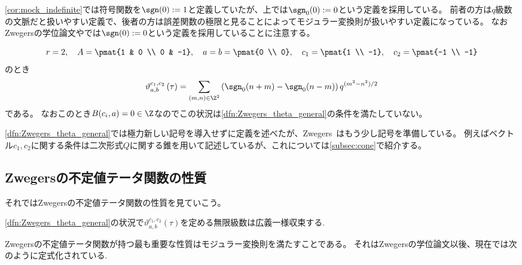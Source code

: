 \documentclass[11pt,b5paper,oneside,lualatex]{ltjsarticle} %
\numberwithin{equation}{section} %
\begin{document}
\begin{rem}
	\cref{cor:mock_indefinite}では符号関数を$ \sgn(0) := 1 $と定義していたが、上では$ \sgn_0(0) := 0 $という定義を採用している。
	前者の方は$ q $級数の文脈だと扱いやすい定義で、後者の方は誤差関数の極限と見ることによってモジュラー変換則が扱いやすい定義になっている。
	なおZwegersの学位論文\cite{Zwegers_thesis}や\cite{BFOR}では$ \sgn(0) := 0 $という定義を採用していることに注意する。
\end{rem}

\begin{ex}
	\[
	r = 2, \quad
	A = \pmat{1 & 0 \\ 0 & -1}, \quad
	a = b = \pmat{0 \\ 0}, \quad
	c_1= \pmat{1 \\ -1}, \quad
	c_2= \pmat{-1 \\ -1}
	\]
	のとき
	\[
	\vartheta_{a, b}^{c_1, c_2} \left( \tau \right)
	=
	\sum_{(m, n) \in \Z^2} \left( \sgn_0(n+m) - \sgn_0(n-m) \right) q^{(m^2 - n^2)/2}
	\]
	である。
	なおこのとき$ B(c_i, a) = 0 \in \Z $なのでこの状況は\cref{dfn:Zwegers_theta_general}の条件を満たしていない。
\end{ex}

\cref{dfn:Zwegers_theta_general}では極力新しい記号を導入せずに定義を述べたが、Zwegers~\cite{Zwegers_thesis}はもう少し記号を準備している。
例えばベクトル$ c_1, c_2 $に関する条件は二次形式$ Q $に関する錐を用いて記述しているが、これについては\cref{subsec:cone}で紹介する。


\subsection{Zwegersの不定値テータ関数の性質} \label{subsec:Zwegers_theta_property}


それではZwegersの不定値テータ関数の性質を見ていこう。

\begin{thm}
	\cref{dfn:Zwegers_theta_general}の状況で$ \vartheta_{a, b}^{c_1, c_2} \left( \tau \right) $を定める無限級数は広義一様収束する. 
\end{thm}

Zwegersの不定値テータ関数が持つ最も重要な性質はモジュラー変換則を満たすことである。
それはZwegersの学位論文以後、現在では次のように定式化されている. 
\end{document}
